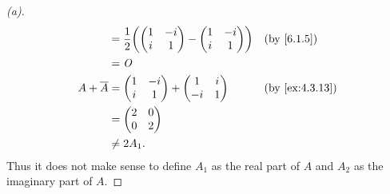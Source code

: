 \begin{proof}[(a)]
\begin{align*}
                 & = \frac{1}{2} \pa{\begin{pmatrix}
                                         1 & -i \\
                                         i & 1
                                       \end{pmatrix} - \begin{pmatrix}
                                                         1 & -i \\
                                                         i & 1
                                                       \end{pmatrix}} &  & \text{(by \cref{6.1.5})} \\
                 & = \zm                                                                          \\
    A + \conj{A} & = \begin{pmatrix}
                       1 & -i \\
                       i & 1
                     \end{pmatrix} + \begin{pmatrix}
                                       1  & i \\
                                       -i & 1
                                     \end{pmatrix}   &  & \text{(by \cref{ex:4.3.13})}            \\
                 & = \begin{pmatrix}
                       2 & 0 \\
                       0 & 2
                     \end{pmatrix}                                                               \\
                 & \neq 2 A_1.
  \end{align*}
  Thus it does not make sense to define \(A_1\) as the real part of \(A\) and \(A_2\) as the imaginary part of \(A\).
\end{proof}

